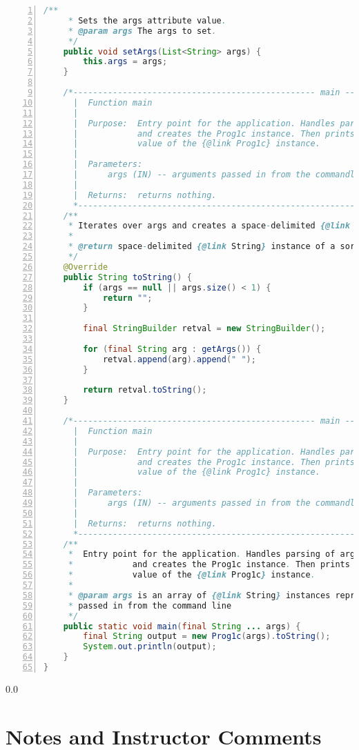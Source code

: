 \documentclass[11pt,notitlepage]{article}
\begin{document}
\begin{lstlisting}[numbers=left,language=java,basicstyle=\scriptsize,backgroundcolor=\color{ubergray},caption={trnapp-config.xml},frame=single,breaklines=true]
    /**
     * Sets the args attribute value.
     * @param args The args to set.
     */
    public void setArgs(List<String> args) {
        this.args = args;
    }

    /*------------------------------------------------- main -----
      |  Function main
      |
      |  Purpose:  Entry point for the application. Handles parsing of arguments
      |            and creates the Prog1c instance. Then prints the {@link String}
      |            value of the {@link Prog1c} instance.
      |
      |  Parameters:
      |      args (IN) -- arguments passed in from the commandline
      |
      |  Returns:  returns nothing.
      *-------------------------------------------------------------------*/
    /**
     * Iterates over args and creates a space-delimited {@link String} instance
     *
     * @return space-delimited {@link String} instance of a sorted {@link List} of {@link String} instances
     */ 
    @Override
    public String toString() {
        if (args == null || args.size() < 1) {
            return "";
        }

        final StringBuilder retval = new StringBuilder();

        for (final String arg : getArgs()) {
            retval.append(arg).append(" ");
        }
        
        return retval.toString();
    }
    
    /*------------------------------------------------- main -----
      |  Function main
      |
      |  Purpose:  Entry point for the application. Handles parsing of arguments
      |            and creates the Prog1c instance. Then prints the {@link String}
      |            value of the {@link Prog1c} instance.
      |
      |  Parameters:
      |      args (IN) -- arguments passed in from the commandline
      |
      |  Returns:  returns nothing.
      *-------------------------------------------------------------------*/
    /**
     *  Entry point for the application. Handles parsing of arguments
     *            and creates the Prog1c instance. Then prints the {@link String}
     *            value of the {@link Prog1c} instance.
     * 
     * @param args is an array of {@link String} instances representing arguments
     * passed in from the command line
     */
    public static void main(final String ... args) {
        final String output = new Prog1c(args).toString();
        System.out.println(output);
    }           
}
\end{lstlisting}

\newpage
  {\setlength{\baselineskip}%
           {0.0\baselineskip}
  \section*{Notes and Instructor Comments}
  \hrulefill \par}
\end{document}
